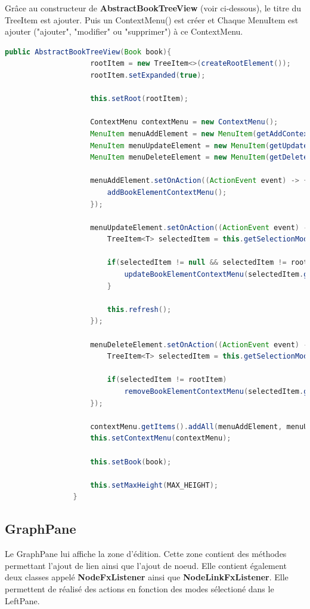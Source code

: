 			Grâce au constructeur de \textbf{AbstractBookTreeView} (voir ci-dessous), le titre du TreeItem est ajouter. Puis un ContextMenu() est créer et Chaque MenuItem est ajouter ("ajouter", "modifier" ou "supprimer") à ce ContextMenu.

			\begin{lstlisting}[gobble=16, language=java, caption=Constructeur de AbstractBookTreeView()]
				public AbstractBookTreeView(Book book){
					rootItem = new TreeItem<>(createRootElement());
					rootItem.setExpanded(true);

					this.setRoot(rootItem);

					ContextMenu contextMenu = new ContextMenu();
					MenuItem menuAddElement = new MenuItem(getAddContextMenuString());
					MenuItem menuUpdateElement = new MenuItem(getUpdateContextMenuString());
					MenuItem menuDeleteElement = new MenuItem(getDeleteContextMenuString());

					menuAddElement.setOnAction((ActionEvent event) -> {
						addBookElementContextMenu();
					});

					menuUpdateElement.setOnAction((ActionEvent event) -> {
						TreeItem<T> selectedItem = this.getSelectionModel().getSelectedItem();

						if(selectedItem != null && selectedItem != rootItem) {
							updateBookElementContextMenu(selectedItem.getValue());
						}

						this.refresh();
					});

					menuDeleteElement.setOnAction((ActionEvent event) -> {
						TreeItem<T> selectedItem = this.getSelectionModel().getSelectedItem();

						if(selectedItem != rootItem)
							removeBookElementContextMenu(selectedItem.getValue());
					});

					contextMenu.getItems().addAll(menuAddElement, menuUpdateElement, menuDeleteElement);
					this.setContextMenu(contextMenu);

					this.setBook(book);

					this.setMaxHeight(MAX_HEIGHT);
				}
			\end{lstlisting}

		\subsection{GraphPane}\label{sub:GraphPane}

			Le GraphPane lui affiche la zone d'édition. Cette zone contient des méthodes permettant l'ajout de lien ainsi que l'ajout de noeud. Elle contient également deux classes appelé \textbf{NodeFxListener} ainsi que \textbf{NodeLinkFxListener}. Elle permettent de réalisé des actions en fonction des modes sélectioné dans le LeftPane.

